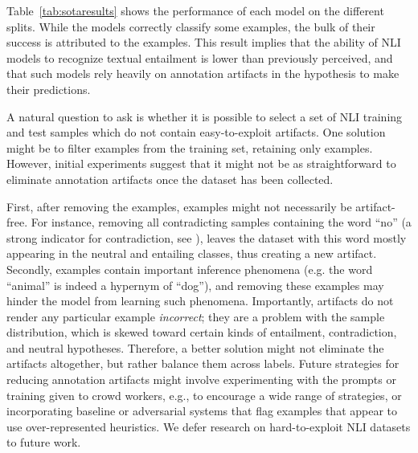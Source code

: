 Table~\ref{tab:sotaresults} shows the performance of each model on the different splits.
While the models correctly classify some \hard examples, the bulk of their success is attributed to the \easy examples. 
This result implies that the ability of NLI models to recognize textual entailment is lower than previously perceived, and that such models rely heavily on annotation artifacts in the hypothesis to make their predictions.


A natural question to ask is whether it is possible to select a set of NLI training and test samples which do not contain easy-to-exploit artifacts.
One  solution might be to filter  \easy examples from the training set, retaining only  \hard examples.
However, initial experiments suggest that it might not be as straightforward to eliminate annotation artifacts once the dataset has been collected.

First, after removing the \easy examples, \hard examples might not necessarily be artifact-free.
For instance, removing all contradicting samples containing the word ``no'' (a strong indicator for contradiction, see ), leaves the \hard dataset with this word mostly appearing in the neutral and entailing classes,
thus creating a new artifact.
Secondly, \easy examples contain important inference phenomena (e.g. the word ``animal'' is indeed a hypernym of ``dog''), and removing these examples may hinder the model from learning such phenomena.
Importantly, artifacts do not render any particular example {\it incorrect}; they are a problem with the sample distribution, which is skewed toward certain kinds of entailment, contradiction, and neutral hypotheses.
Therefore, a better solution might not eliminate the artifacts altogether, but rather balance them across labels.
Future strategies for reducing annotation artifacts might involve experimenting with the prompts or training given to crowd workers, e.g., to encourage a wide range of strategies, or incorporating baseline or adversarial systems that flag examples that appear to use over-represented heuristics.
We defer research on hard-to-exploit NLI datasets to future work. 
